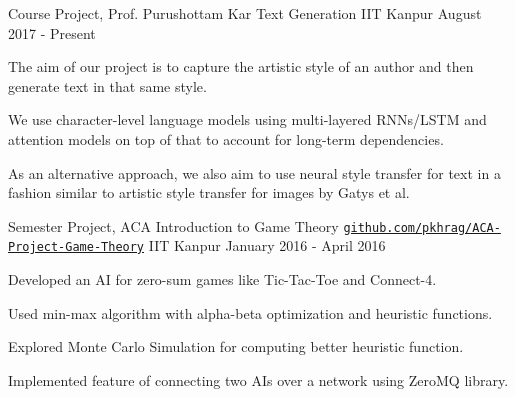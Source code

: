 \documentclass[12pt, a4paper]{awesome-cv}
\begin{document}
\begin{cventries}
{\begin{cvitems}
      \end{cvitems}
    }
  \cventry
  {Course Project, Prof. Purushottam Kar}
  {Text Generation}
  {IIT Kanpur}
  {August 2017 - Present}
  {
      \begin{cvitems}
              \item The aim of our project is to capture the artistic style of an author and then generate text in that same style.
              \item We use character-level language models using multi-layered RNNs/LSTM and attention models on top of that to account for long-term dependencies.
              \item As an alternative approach, we also aim to use neural style transfer for text in a fashion similar to artistic style transfer for images by Gatys et al.
      \end{cvitems}
  }
  \cventry
    {Semester Project, ACA}
    {Introduction to Game Theory \texttt{\href{https://github.com/pkhrag/ACA-Project-Game-Theory}{github.com/pkhrag/ACA-Project-Game-Theory}}}
    {IIT Kanpur}	
    {January 2016 - April 2016}
    {
      \begin{cvitems}
    	\item Developed an AI for zero-sum games like Tic-Tac-Toe and Connect-4.
    	\item Used min-max algorithm with alpha-beta optimization and heuristic functions.
        \item Explored Monte Carlo Simulation for computing better heuristic function.
    	\item Implemented feature of connecting two AIs over a network using ZeroMQ library.
      \end{cvitems}
    }

\end{cventries}
\end{document}
